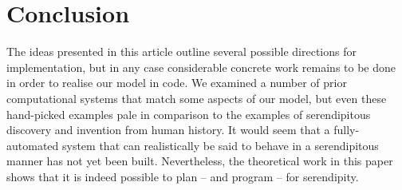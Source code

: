 \section{Conclusion} \label{sec:conclusion}

The ideas presented in this article outline several possible
directions for implementation, but in any case considerable concrete
work remains to be done in order to realise our model in code.  We
examined a number of prior computational systems that match some
aspects of our model, but even these hand-picked examples pale in
comparison to the examples of serendipitous discovery and invention
from human history.  It would seem that a fully-automated system that
can realistically be said to behave in a serendipitous manner has not
yet been built.
Nevertheless, the theoretical work in this paper shows that it is
indeed possible to plan -- and program -- for serendipity.
